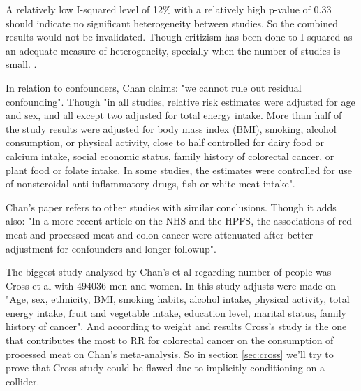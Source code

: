 \documentclass{article}
\begin{document}
A relatively low I-squared level of 12\% with a relatively high p-value of 0.33 should indicate no significant heterogeneity between studies. So the combined results would not be invalidated. Though critizism has been done to I-squared as an adequate measure of heterogeneity, specially when the number of studies is small. \cite{hippel}.

In relation to confounders, Chan claims: "we cannot rule out residual confounding". Though "in all studies, relative risk estimates were adjusted for age and sex, and all except two adjusted for total energy intake. More than
half of the study results were adjusted for body mass index (BMI), smoking, alcohol consumption, or physical activity, close to half controlled for dairy food or calcium intake, social economic status,
family history of colorectal cancer, or plant food or folate intake.
In some studies, the estimates were controlled for use of nonsteroidal
anti-inflammatory drugs, fish or white meat intake". %

Chan's paper refers to other studies with similar conclusions.\cite{aicr,wei2009}
Though it adds also: "In a more recent article on the NHS and the HPFS, the
associations of red meat and processed meat and colon cancer were
attenuated after better adjustment for confounders and longer followup".\cite{wei}

The biggest study analyzed by Chan's et al\cite{chan} regarding number of people was Cross et al\cite{cross} with 494036 men and women. In this study adjusts were made on "Age, sex, ethnicity, BMI, smoking habits, alcohol intake, physical activity, total energy intake, fruit and vegetable intake, education level, marital status, family history of cancer".
And according to weight and results Cross's study is the one that contributes the most to RR for colorectal cancer on the consumption of processed meat on Chan's meta-analysis. So in section \ref{sec:cross} we'll try to prove that Cross study could be flawed due to implicitly conditioning on a collider.
\end{document}
